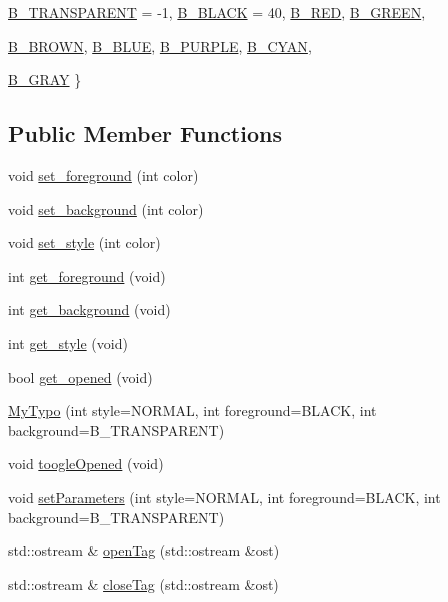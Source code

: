 \begin{DoxyCompactItemize}
\hyperlink{classMyTypo_ac6643b465e94f6ecb7fb650c4b3531e8ab5db6d6b3a486ef6d773c3c04c1281b4}{B\_\-TRANSPARENT} =  -\/1, 
\hyperlink{classMyTypo_ac6643b465e94f6ecb7fb650c4b3531e8ac2e0d75a46d7044e594d4f89cb76b4ca}{B\_\-BLACK} =  40, 
\hyperlink{classMyTypo_ac6643b465e94f6ecb7fb650c4b3531e8aeb1941bfc2f16a35302f10000684a6ef}{B\_\-RED}, 
\hyperlink{classMyTypo_ac6643b465e94f6ecb7fb650c4b3531e8aac6076a603ab6c8be9a700e115c01453}{B\_\-GREEN}, 
\par
\hyperlink{classMyTypo_ac6643b465e94f6ecb7fb650c4b3531e8afd8a2faa10bc6f4f68066e8a8064ec3f}{B\_\-BROWN}, 
\hyperlink{classMyTypo_ac6643b465e94f6ecb7fb650c4b3531e8a08b6e71d66570f7a3e34cc7995e85317}{B\_\-BLUE}, 
\hyperlink{classMyTypo_ac6643b465e94f6ecb7fb650c4b3531e8a4d7b53c84bb3c21ca6adae139dca95de}{B\_\-PURPLE}, 
\hyperlink{classMyTypo_ac6643b465e94f6ecb7fb650c4b3531e8a6762080d090818122cabaf479be290a6}{B\_\-CYAN}, 
\par
\hyperlink{classMyTypo_ac6643b465e94f6ecb7fb650c4b3531e8a85f06fb2e3d8b757294edc6eecabf43e}{B\_\-GRAY}
 \}
\end{DoxyCompactItemize}
\subsection*{Public Member Functions}
\begin{DoxyCompactItemize}
\item 
void \hyperlink{classMyTypo_a3422166dfc3911a36c32271e0434587d}{set\_\-foreground} (int color)
\item 
void \hyperlink{classMyTypo_a325589499eb8e5c4b52355011f7b9cf3}{set\_\-background} (int color)
\item 
void \hyperlink{classMyTypo_a94dc39fef3ca57dc956deda92514c648}{set\_\-style} (int color)
\item 
int \hyperlink{classMyTypo_a554372a4548dda7c157d69fe0651a23f}{get\_\-foreground} (void)
\item 
int \hyperlink{classMyTypo_ad935060c132f772a2a1239bc6426d5de}{get\_\-background} (void)
\item 
int \hyperlink{classMyTypo_af181779fdfb0eb793136408e2a4fec94}{get\_\-style} (void)
\item 
bool \hyperlink{classMyTypo_ad44b40659d3e5cf17f22677264ca6ab9}{get\_\-opened} (void)
\item 
\hyperlink{classMyTypo_a7ab56324aa7eb1bf6efca62d14d07bee}{MyTypo} (int style=NORMAL, int foreground=BLACK, int background=B\_\-TRANSPARENT)
\item 
void \hyperlink{classMyTypo_ac0cf15a492908e3efdc6b57e1eff4390}{toogleOpened} (void)
\item 
void \hyperlink{classMyTypo_ab1f48a8f65a17b5240c393af75ef2657}{setParameters} (int style=NORMAL, int foreground=BLACK, int background=B\_\-TRANSPARENT)
\item 
std::ostream \& \hyperlink{classMyTypo_ae352299f62ef344e98f10a900546c83c}{openTag} (std::ostream \&ost)
\item 
std::ostream \& \hyperlink{classMyTypo_a6572b9b25e66990a26308e6bbc9ec301}{closeTag} (std::ostream \&ost)
\end{DoxyCompactItemize}


